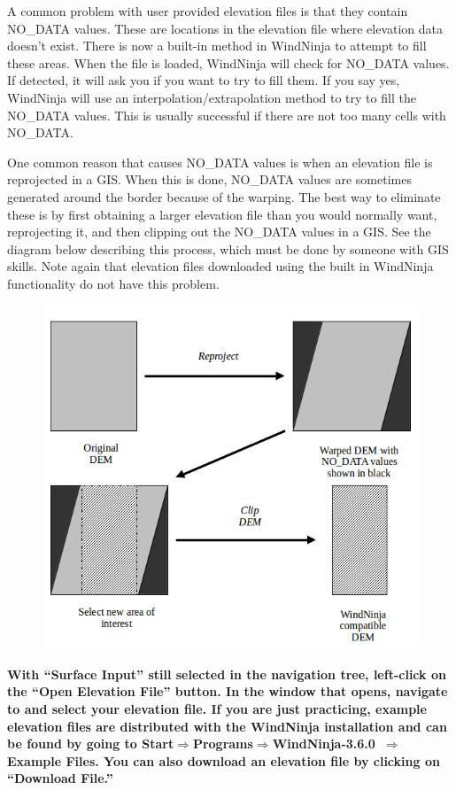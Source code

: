 \documentclass[12pt]{article}
\newcommand\vn{3.6.0}
\begin{document}
A common problem with user provided elevation files is that they contain NO\_DATA values.  These are locations in the elevation file where elevation data doesn’t exist.  There is now a built-in method in WindNinja to attempt to fill these areas.  When the file is loaded, WindNinja will check for NO\_DATA values.  If detected, it will ask you if you want to try to fill them.  If you say yes, WindNinja will use an interpolation/extrapolation method to try to fill the NO\_DATA values.  This is usually successful if there are not too many cells with NO\_DATA.

One common reason that causes NO\_DATA values is when an elevation file is reprojected in a GIS.  When this is done, NO\_DATA values are sometimes generated around the border because of the warping.  The best way to eliminate these is by first obtaining a larger elevation file than you would normally want, reprojecting it, and then clipping out the NO\_DATA values in a GIS.  See the diagram below describing this process, which must be done by someone with GIS skills.  Note again that elevation files downloaded using the built in WindNinja functionality do not have this problem.

\begin{figure}[H]
	\centering
	\label{}
	\includegraphics[scale=1.0]{dem_crop.png}
\end{figure}

\textbf{\color{red} With “Surface Input” still selected in the navigation tree, left-click on the “Open Elevation File” button.  In the window that opens, navigate to and select your elevation file.  If you are just practicing, example elevation files are distributed with the WindNinja installation and can be found by going to Start$\Rightarrow$Programs$\Rightarrow$WindNinja-\vn\ $\Rightarrow$Example Files.  You can also download an elevation file by clicking on “Download File.”}
\end{document}
